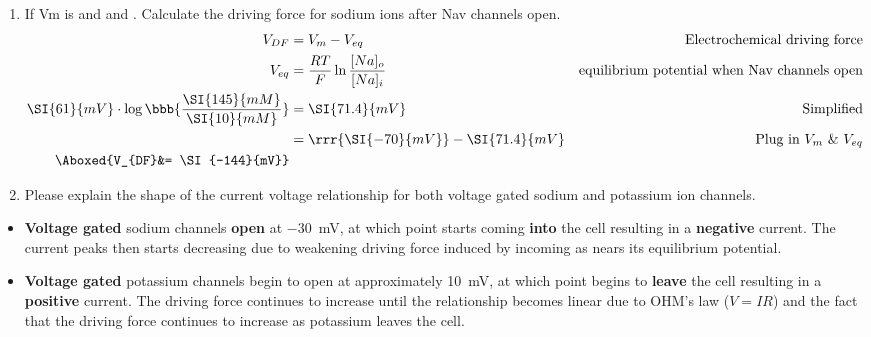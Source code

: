 \documentclass[plain,worksheet]{inVerba-notes}
\begin{document}
\begin{enumerate}
    \item If Vm is  and  and . Calculate the driving force for sodium ions after Nav channels open.
    \begin{align*}
        V_{DF}&=V_{m}-V_{eq} & \text{Electrochemical driving force}\\
        V_{eq} &= \frac{RT}{F}\ln{\frac{[Na]_{o}}{[Na]_{i}}} & \text{equilibrium potential when Nav channels open}\\
        \SI{61}{mV}\cdot\log{\bbb{\frac{\SI{145}{mM}}{\SI{10}{mM}}}}&=\SI{71.4}{mV} & \text{Simplified} \\
        &= \rrr{\SI{-70}{mV}} - \SI{71.4}{mV} & \text{Plug in}~V_m~\&~V_{eq}\\
        \Aboxed{V_{DF}&= \SI{-144}{mV}}
    \end{align*}

    \newpage
    \item Please explain the shape of the current voltage relationship for both voltage gated sodium and potassium ion channels.
\end{enumerate}
    \begin{center}
        
    \end{center}

    \begin{itemize}
        \item \textbf{Voltage gated} sodium channels \textbf{open} at \SI{-30}{mV}, at which point  starts coming \textbf{into} the cell resulting in a \textbf{negative} current. The current peaks then starts decreasing due to weakening driving force induced by incoming  as nears its equilibrium potential.
    \end{itemize}
     
    \bigskip
    \begin{center}
    
    \end{center}

    \begin{itemize}
        \item \textbf{Voltage gated} potassium channels begin to open at approximately \SI{10}{mV}, at which point  begins to \textbf{leave} the cell resulting in a \textbf{positive} current. The driving force continues to increase until the relationship becomes linear due to OHM's law (\(V=IR\)) and the fact that the driving force continues to increase as potassium leaves the cell.
    \end{itemize}
        
\end{document}

